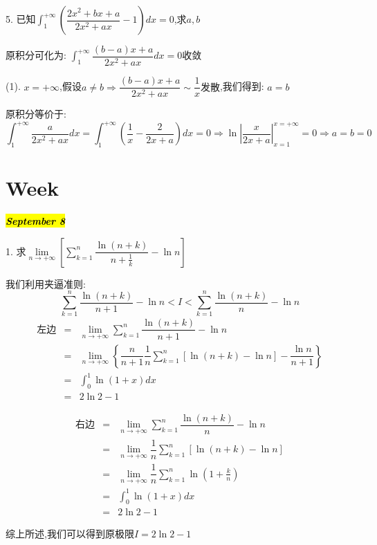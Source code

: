 5. 已知$\int_{1}^{+\infty}\left( \dfrac{2x^2+bx+a}{2x^2+ax}-1\right)dx=0$,求$a,b$

\begin{solution}

	原积分可化为:  $\int_{1}^{+\infty}\dfrac{(b-a)x+a}{2x^2+ax}dx=0\text{收敛}$
	
	(1). $x=+\infty$,假设$a\neq b\Rightarrow \dfrac{(b-a)x+a}{2x^2+ax}\sim \dfrac{1}{x}\text{发散}$,我们得到:  $a=b$
	
	原积分等价于:  $$\int_{1}^{+\infty}\dfrac{a}{2x^2+ax}dx=\int_{1}^{+\infty}(\dfrac{1}{x}-\dfrac{2}{2x+a})dx=0\Rightarrow \ln|\dfrac{x}{2x+a}|_{x=1}^{x=+\infty}=0\Rightarrow a=b=0$$
\end{solution}

\section{Week }
\hl{\textbf{\textit{September 8}}}

1. 求$\lim\limits_{n\rightarrow +\infty}\left[\sum\limits_{k=1}^{n}\dfrac{\ln(n+k)}{n+\frac{1}{k}}-\ln n\right] $ 

\begin{solution}

	我们利用夹逼准则:  $$\sum\limits_{k=1}^{n}\dfrac{\ln(n+k)}{n+1}-\ln n<I<\sum\limits_{k=1}^{n}\dfrac{\ln(n+k)}{n}-\ln n$$
	\begin{eqnarray*}
		\text{左边}&=&\lim\limits_{n\rightarrow +\infty}\sum\limits_{k=1}^{n}\dfrac{\ln(n+k)}{n+1}-\ln n\\
		&=&\lim\limits_{n\rightarrow +\infty}\left\lbrace \dfrac{n}{n+1}\dfrac{1}{n}\sum\limits_{k=1}^{n}[\ln(n+k)-\ln n]-\dfrac{\ln n}{n+1}\right\rbrace \\
		&=&\int_{0}^{1}\ln(1+x)dx\\
		&=&2\ln2-1
	\end{eqnarray*}
	
	\begin{eqnarray*}
		\text{右边}&=&\lim\limits_{n\rightarrow +\infty}\sum\limits_{k=1}^{n}\dfrac{\ln(n+k)}{n}-\ln n\\
		&=&\lim\limits_{n\rightarrow +\infty}\dfrac{1}{n}\sum\limits_{k=1}^{n}[\ln(n+k)-\ln n]\\
		&=&\lim\limits_{n\rightarrow +\infty}\dfrac{1}{n}\sum\limits_{k=1}^{n}\ln(1+\frac{k}{n})\\
		&=&\int_{0}^{1}\ln(1+x)dx\\
		&=&2\ln2-1
	\end{eqnarray*}
	
	综上所述,我们可以得到原极限$I=2\ln2-1$
\end{solution}

